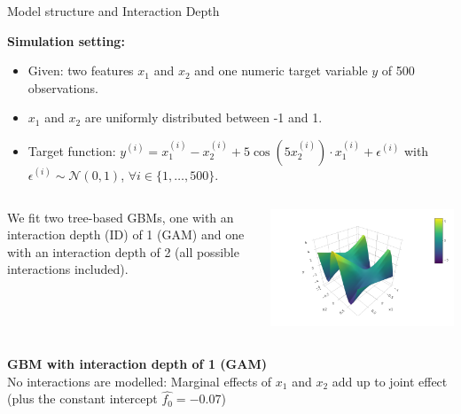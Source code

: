 \begin{vbframe}{Model structure and Interaction Depth}
\framebreak


\textbf{Simulation setting:}
\begin{itemize}
\item Given: two features $x_1$ and $x_2$ and one numeric target variable $y$ of 500 observations.
\item $x_1$ and $x_2$ are uniformly distributed between -1 and 1.
\item Target function: $y^{(i)} = x_1^{(i)} -  x_2^{(i)} + 5\cos(5 x_2^{(i)}) \cdot x_1^{(i)} + \epsilon^{(i)}$ with $\epsilon^{(i)} \sim \mathcal{N}(0, 1)$, $\forall i \in \{1, \dots, 500\}$.
\end{itemize} 
\vspace*{0.3cm}
\begin{columns}
\column{4.5cm}
We fit two tree-based GBMs, one with an interaction depth (ID) of 1 (GAM) and one with an interaction depth of 2 (all possible interactions included).

\column{5.5cm}
\vspace*{-0.3cm}
\begin{center}
\includegraphics[width=\textwidth]{figure_man/boosting_interaction_targetfunction3D.PNG}
\end{center}
\end{columns}
\framebreak
\textbf{GBM with interaction depth of 1 (GAM)}\\
No interactions are modelled: Marginal effects of $x_1$ and $x_2$ add up to joint effect (plus the constant intercept $\hat{f_0} = -0.07$)


\end{vbframe}
